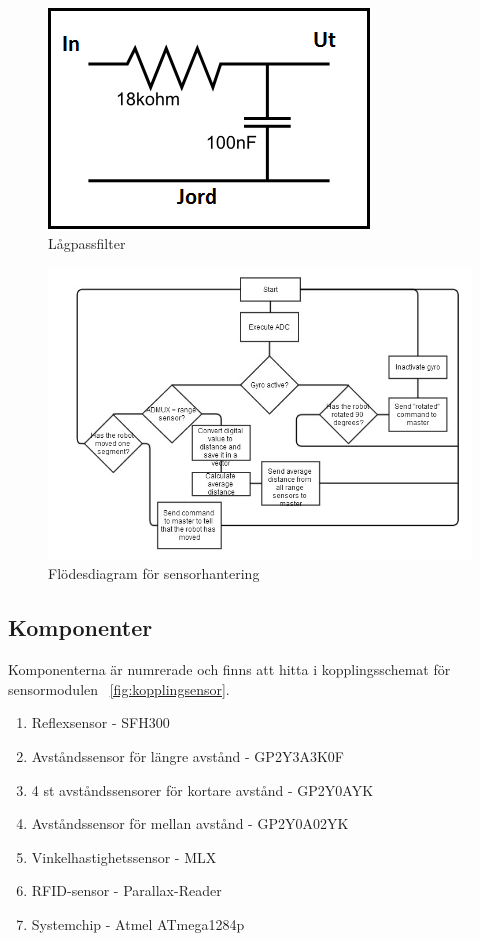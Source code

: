 \documentclass[a4paper,12pt,fleqn]{article}
\begin{document}
\begin{figure}[htp] %
  \begin{center}
  \includegraphics[keepaspectratio=true,width=0.3\linewidth]{bilder/lp-filter2}  %
  \end{center}
  \caption{Lågpassfilter} %
  \label{fig:lpfilter}
\end{figure}

\begin{figure}[htp] %
  \begin{center}
  \includegraphics[keepaspectratio=true,width=0.8\linewidth]{bilder/sensorflode}  %
  \end{center}
  \caption{Flödesdiagram för sensorhantering} %
  \label{fig:sensorflow}
\end{figure}

\subsection{Komponenter}
Komponenterna är numrerade och finns att hitta i kopplingsschemat för sensormodulen ~\ref{fig:kopplingsensor}.
\begin{enumerate}
	\item Reflexsensor - SFH300
	\item Avståndssensor för längre avstånd - GP\-2Y3A\-3K\-0F
	\item 4 st avståndssensorer för kortare avstånd - GP\-2Y\-0A\-YK
	\item Avståndssensor för mellan avstånd - GP2Y0A02YK
	\item Vinkelhastighetssensor - MLX
	\item RFID-sensor - Par\-all\-ax-Read\-er\
	\item Systemchip - Atmel ATmega1284p
\end{enumerate}
~\\
\end{document}
